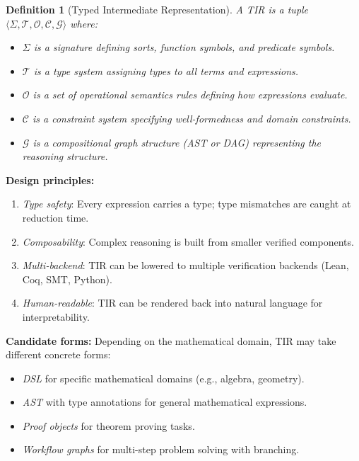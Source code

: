 \documentclass[11pt,a4paper]{article}
\newtheorem{definition}{Definition}
\begin{document}
\begin{definition}[Typed Intermediate Representation]
A TIR is a tuple $\langle \Sigma, \mathcal{T}, \mathcal{O}, \mathcal{C}, \mathcal{G} \rangle$ where:
\begin{itemize}
    \item $\Sigma$ is a \textit{signature} defining sorts, function symbols, and predicate symbols.
    \item $\mathcal{T}$ is a \textit{type system} assigning types to all terms and expressions.
    \item $\mathcal{O}$ is a set of \textit{operational semantics} rules defining how expressions evaluate.
    \item $\mathcal{C}$ is a \textit{constraint system} specifying well-formedness and domain constraints.
    \item $\mathcal{G}$ is a \textit{compositional graph structure} (AST or DAG) representing the reasoning structure.
\end{itemize}
\end{definition}

\textbf{Design principles:}
\begin{enumerate}[leftmargin=*]
    \item \textit{Type safety}: Every expression carries a type; type mismatches are caught at reduction time.
    \item \textit{Composability}: Complex reasoning is built from smaller verified components.
    \item \textit{Multi-backend}: TIR can be lowered to multiple verification backends (Lean, Coq, SMT, Python).
    \item \textit{Human-readable}: TIR can be rendered back into natural language for interpretability.
\end{enumerate}

\textbf{Candidate forms:} Depending on the mathematical domain, TIR may take different concrete forms:
\begin{itemize}[leftmargin=*]
    \item \textit{DSL} for specific mathematical domains (e.g., algebra, geometry).
    \item \textit{AST} with type annotations for general mathematical expressions.
    \item \textit{Proof objects} for theorem proving tasks.
    \item \textit{Workflow graphs} for multi-step problem solving with branching.
\end{itemize}
\end{document}
